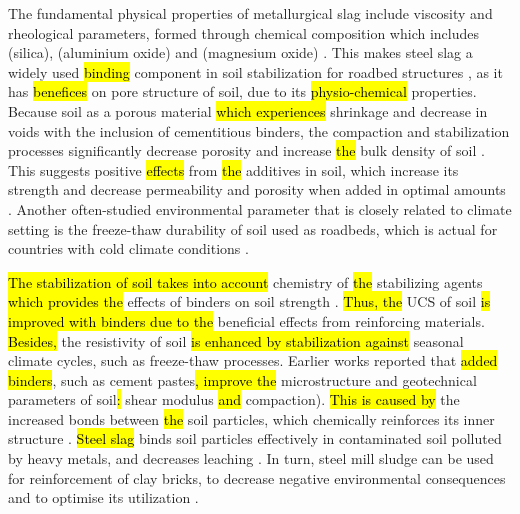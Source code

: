 \documentclass[electronics,article,submit,pdftex,moreauthors]{Definitions/mdpi}
\begin{document}
The fundamental physical properties of metallurgical slag include viscosity and rheological parameters, formed through chemical composition which includes  (silica),  (aluminium oxide) and  (magnesium oxide) \cite{Slezak}. This makes steel slag a widely used \hl{binding} component in soil stabilization for roadbed structures \cite{Mraz,Lindh2004,Erdenebold}, as it has \hl{benefices} on pore structure of soil, due to its \hl{physio-chemical} properties. Because soil as a porous\hl{ }material \hl{which experiences} shrinkage and decrease in voids with the inclusion of cementitious binders, the compaction and stabilization processes significantly decrease porosity and increase \hl{the} bulk density of soil \cite{Bhattacharjee}. This suggests positive \hl{effects} from \hl{the} additives in soil, which increase its strength and decrease permeability and porosity when added in optimal amounts \cite{Ozelim,Lindh}. Another often-studied environmental parameter that is closely related to climate setting is the freeze-thaw durability of soil used as roadbeds, which is actual for countries with cold climate conditions \cite{Su,Sahlabadi}. 

\hl{The stabilization of soil takes into account }chemistry of \hl{the} stabilizing agents \hl{which provides the} effects of binders on soil strength \cite{Bowers}. \hl{Thus, the} UCS of soil \hl{is improved with binders due to the} beneficial effects from reinforcing materials. \hl{Besides, }the resistivity of soil \hl{is enhanced by stabilization against} seasonal climate cycles, such as freeze-thaw processes. Earlier works reported that \hl{added binders}, such as cement pastes\hl{, improve the} microstructure and geotechnical parameters of soil\hl{: }shear modulus \hl{and} compaction). \hl{This is caused by} the increased bonds between \hl{the} soil particles, which chemically reinforces its inner structure \cite{Ghorbani,Rajabi,Zhangetal2018}. \hl{Steel slag} binds soil particles effectively in contaminated soil polluted by heavy metals, and decreases leaching \cite{Negim,Lindh2022d,Moon}. In\hl{ }turn, steel mill sludge can be used for reinforcement of clay bricks, to decrease negative environmental consequences\hl{ }and to optimise its utilization \cite{Sarani}.
\end{document}
